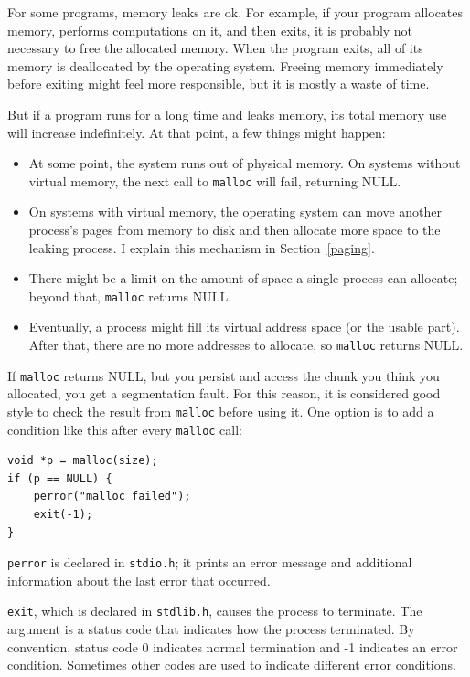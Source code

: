\documentclass[12pt]{book}
\begin{document}
{For some programs, memory leaks are ok.  For example, if your program
allocates memory, performs computations on it, and then exits, it is
probably not necessary to free the allocated memory.  When the program
exits, all of its memory is deallocated by the operating system.
Freeing memory immediately before exiting might feel more responsible,
but it is mostly a waste of time.

But if a program runs for a long time and leaks memory, its total
memory use will increase indefinitely.  At that point, a few things
might happen:

\begin{itemize}

\item At some point, the system runs out of physical memory.  On
  systems without virtual memory, the next call to {\tt malloc} will
  fail, returning NULL.

\item On systems with virtual memory, the operating system can move
  another process's pages from memory to disk and then allocate
  more space to the leaking process.  I explain this mechanism
  in Section~\ref{paging}.

\item There might be a limit on the amount of space a single
  process can allocate; beyond that, {\tt malloc} returns NULL.

\item Eventually, a process might fill its virtual address space (or
  the usable part).  After that, there are no more addresses to
  allocate, so {\tt malloc} returns NULL.

\end{itemize}

If {\tt malloc} returns NULL, but you persist and access
the chunk you think you allocated, you get a segmentation fault.
For this reason, it is considered good style to check the result from
{\tt malloc} before using it.  One option is to add a condition like
this after every {\tt malloc} call:

\begin{verbatim}
void *p = malloc(size);
if (p == NULL) {
    perror("malloc failed");
    exit(-1);
}
\end{verbatim}

{\tt perror} is declared in {\tt stdio.h}; it prints
an error message and additional information about the last error
that occurred.

{\tt exit}, which is declared in {\tt stdlib.h}, causes the process
to terminate.  The argument is a status code that indicates how
the process terminated.  By convention, status code 0 indicates normal
termination and -1 indicates an error condition.  Sometimes other
codes are used to indicate different error conditions.

}
\end{document}

